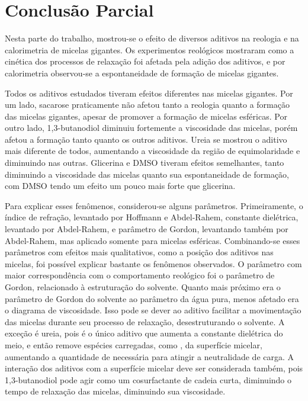 		\section{Conclusão Parcial}
		
		Nesta parte do trabalho, mostrou-se o efeito de diversos aditivos na reologia e na calorimetria de micelas gigantes. Os experimentos reológicos mostraram como a cinética dos processos de relaxação foi afetada pela adição dos aditivos, e por calorimetria observou-se a espontaneidade de formação de micelas gigantes.
		
		Todos os aditivos estudados tiveram efeitos diferentes nas micelas gigantes. Por um lado, sacarose praticamente não afetou tanto a reologia quanto a formação das micelas gigantes, apesar de promover a formação de micelas esféricas. Por outro lado, 1,3-butanodiol diminuiu fortemente a viscosidade das micelas, porém afetou a formação tanto quanto os outros aditivos. Ureia se mostrou o aditivo mais diferente de todos, aumentando a viscosidade da região de equimolaridade e diminuindo nas outras. Glicerina e DMSO tiveram efeitos semelhantes, tanto diminuindo a viscosidade das micelas quanto sua espontaneidade de formação, com DMSO tendo um efeito um pouco mais forte que glicerina.
		
		Para explicar esses fenômenos, considerou-se alguns parâmetros. Primeiramente, o índice de refração, levantado por Hoffmann e Abdel-Rahem, constante dielétrica, levantado por Abdel-Rahem, e parâmetro de Gordon, levantando também por Abdel-Rahem, mas aplicado somente para micelas esféricas. Combinando-se esses parâmetros com efeitos mais qualitativos, como a posição dos aditivos nas micelas, foi possível explicar bastante os fenômenos observados. O parâmetro com maior correspondência com o comportamento reológico foi o parâmetro de Gordon, relacionado à estruturação do solvente. Quanto mais próximo era o parâmetro de Gordon do solvente ao parâmetro da água pura, menos afetado era o diagrama de viscosidade. Isso pode se dever ao aditivo facilitar a movimentação das micelas durante seu processo de relaxação, desestruturando o solvente. A exceção é ureia, pois é o único aditivo que aumenta a constante dielétrica do meio, e então remove espécies carregadas, como \Sal, da superfície micelar, aumentando a quantidade de \Sal{} necessária para atingir a neutralidade de carga. A interação dos aditivos com a superfície micelar deve ser considerada também, pois 1,3-butanodiol pode agir como um cosurfactante de cadeia curta, diminuindo o tempo de relaxação das micelas, diminuindo sua viscosidade.
		
